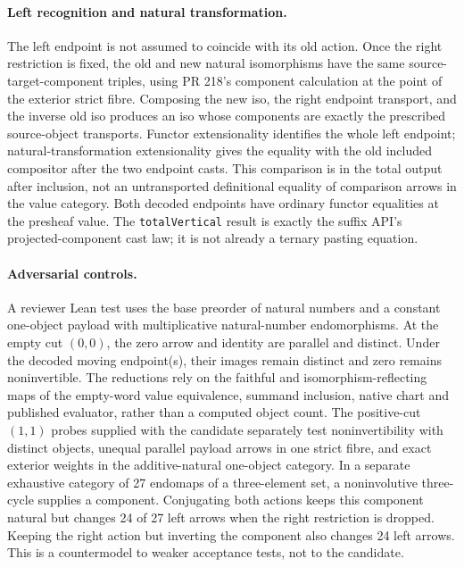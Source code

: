 \paragraph{Left recognition and natural transformation.}
The left endpoint is not assumed to coincide with its old action. Once the right restriction is fixed, the old and new natural isomorphisms have the same source-target-component triples, using PR 218's component calculation at the point of the exterior strict fibre.
Composing the new iso, the right endpoint transport, and the inverse old iso produces an iso whose components are exactly the prescribed source-object transports.
Functor extensionality identifies the whole left endpoint; natural-transformation extensionality gives the equality with the old included compositor after the two endpoint casts. This comparison is in the total output after inclusion, not an untransported definitional equality of comparison arrows in the value category.
Both decoded endpoints have ordinary functor equalities at the presheaf value. The \texttt{totalVertical} result is exactly the suffix API's projected-component cast law; it is not already a ternary pasting equation.
\paragraph{Adversarial controls.}
A reviewer Lean test uses the base preorder of natural numbers and a constant one-object payload with multiplicative natural-number endomorphisms. At the empty cut $(0,0)$, the zero arrow and identity are parallel and distinct. Under the decoded moving endpoint(s), their images remain distinct and zero remains noninvertible. The reductions rely on the faithful and isomorphism-reflecting maps of the empty-word value equivalence, summand inclusion, native chart and published evaluator, rather than a computed object count. The positive-cut $(1,1)$ probes supplied with the candidate separately test noninvertibility with distinct objects, unequal parallel payload arrows in one strict fibre, and exact exterior weights in the additive-natural one-object category.
In a separate exhaustive category of 27 endomaps of a three-element set, a noninvolutive three-cycle supplies a component. Conjugating both actions keeps this component natural but changes 24 of 27 left arrows when the right restriction is dropped. Keeping the right action but inverting the component also changes 24 left arrows. This is a countermodel to weaker acceptance tests, not to the candidate.
